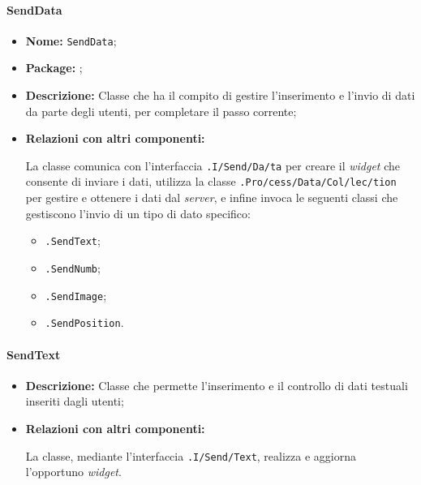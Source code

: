 \paragraph{SendData}
\begin{flushleft}
\begin{itemize}
\item \textbf{Nome:} \texttt{SendData};
\item \textbf{Package:} \texttt{\logicUser};
\item \textbf{Descrizione:} Classe che ha il compito di gestire l'inserimento e l'invio di dati da parte degli utenti, per completare il passo corrente;
\item \textbf{Relazioni con altri componenti:}
\begin{sloppypar}
La classe comunica con l'interfaccia \texttt{\viewUser{}.I\fshyp{}Send\fshyp{}Da\fshyp{}ta} per creare il \textit{widget} che consente di inviare i dati, utilizza la classe \texttt{\collectionu{}.Pro\fshyp{}cess\fshyp{}Data\fshyp{}Col\fshyp{}lec\fshyp{}tion} per gestire e ottenere i dati dal \textit{server}, e infine invoca le seguenti classi che gestiscono l'invio di un tipo di dato specifico:
\begin{itemize}
	\item \texttt{\logicUser{}.SendText};
	\item \texttt{\logicUser{}.SendNumb};
	\item \texttt{\logicUser{}.SendImage};
	\item \texttt{\logicUser{}.SendPosition}.
\end{itemize}
\end{sloppypar}
\end{itemize}
\end{flushleft}

\paragraph{SendText}
\label{sendText}
\begin{flushleft}
\begin{itemize}
\item \textbf{Descrizione:} Classe che permette l'inserimento e il controllo di dati testuali inseriti dagli utenti;
\item \textbf{Relazioni con altri componenti:}
\begin{sloppypar}
La classe, mediante l'interfaccia \texttt{\viewUser{}.I\fshyp{}Send\fshyp{}Text}, realizza e aggiorna l'opportuno \textit{widget}.
\end{sloppypar}
\end{itemize}
\end{flushleft}

